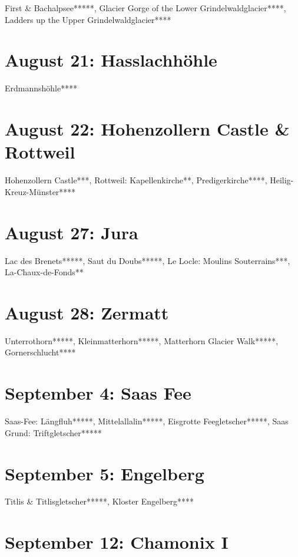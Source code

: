First \& Bachalpsee*****, Glacier Gorge of the Lower Grindelwaldglacier****, Ladders up the Upper Grindelwaldglacier****

\section{August 21: Hasslachh\"ohle}
\label{2010Hasslach}

Erdmannsh\"ohle****

\section{August 22: Hohenzollern Castle \& Rottweil}
\label{2010Hohenzollern}

Hohenzollern Castle***, Rottweil: Kapellenkirche**, Predigerkirche****, Heilig-Kreuz-M\"unster****

\section{August 27: Jura}
\label{jura2010}

Lac des Brenets*****, Saut du Doubs*****, Le Locle: Moulins Souterrains***, La-Chaux-de-Fonds**

\section{August 28: Zermatt}
\label{Zermatt2010}

Unterrothorn*****, Kleinmatterhorn*****, Matterhorn Glacier Walk*****, Gornerschlucht****

\section{September 4: Saas Fee}
\label{2010SaasFee}

Saas-Fee: L\"angfluh*****, Mittelallalin*****, Eisgrotte Feegletscher*****, Saas Grund: Triftgletscher*****

\section{September 5: Engelberg}
\label{2010Titlis}

Titlis \& Titlisgletscher*****, Kloster Engelberg****

\section{September 12: Chamonix I}
\label{2010ChamonixI}

